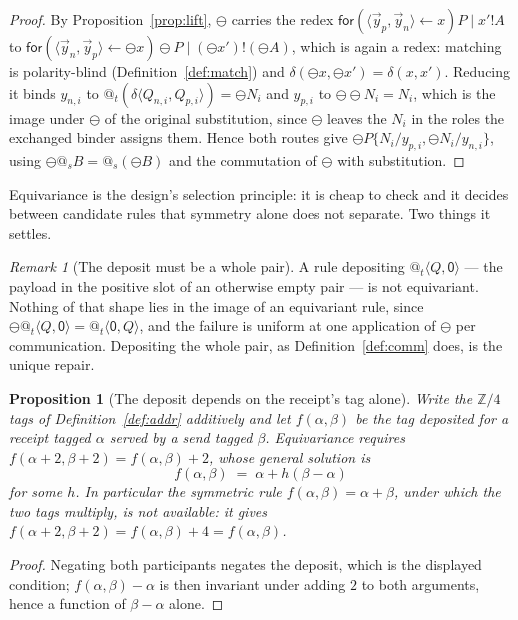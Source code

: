 \documentclass[11pt]{article}
\makeatletter
\newtheorem{proposition}[theorem]{Proposition}
\theoremstyle{definition}
\theoremstyle{remark}
\newtheorem{remark}[theorem]{Remark}
\newcommand{\pzero}{\mathsf{0}}
\newcommand{\quo}[1]{\ensuremath{@_{#1}}}
\newcommand{\dip}[2]{\ensuremath{\langle #1 , #2 \rangle}}
\newcommand{\negop}{\ensuremath{\ominus}}
\makeatother
\begin{document}
\begin{proof}
By Proposition~\ref{prop:lift}, $\negop$ carries the redex
$\mathsf{for}(\dip{\vec{y}_p}{\vec{y}_n} \leftarrow x)P \mid x'!A$ to
$\mathsf{for}(\dip{\vec{y}_n}{\vec{y}_p} \leftarrow \negop x)\negop P \mid
(\negop x')!(\negop A)$, which is again a redex: matching is polarity-blind
(Definition~\ref{def:match}) and $\delta(\negop x, \negop x') = \delta(x,x')$.
Reducing it binds $y_{n,i}$ to $\quo{t}(\delta\dip{Q_{n,i}}{Q_{p,i}}) = \negop
N_i$ and $y_{p,i}$ to $\negop\negop N_i = N_i$, which is the image under
$\negop$ of the original substitution, since $\negop$ leaves the $N_i$ in the
roles the exchanged binder assigns them. Hence both routes give
$\negop P\{N_i/y_{p,i}, \negop N_i/y_{n,i}\}$, using $\negop\quo{s}B =
\quo{s}(\negop B)$ and the commutation of $\negop$ with substitution.
\end{proof}

Equivariance is the design's selection principle: it is cheap to check and it
decides between candidate rules that symmetry alone does not separate. Two
things it settles.

\begin{remark}[The deposit must be a whole pair]
\label{rem:selection}
A rule depositing $\quo{t}\dip{Q}{\pzero}$ --- the payload in the positive slot
of an otherwise empty pair --- is not equivariant. Nothing of that shape lies in
the image of an equivariant rule, since
$\negop\quo{t}\dip{Q}{\pzero} = \quo{t}\dip{\pzero}{Q}$, and the failure is
uniform at one application of $\negop$ per communication. Depositing the whole
pair, as Definition~\ref{def:comm} does, is the unique repair.
\end{remark}

\begin{proposition}[The deposit depends on the receipt's tag alone]
\label{prop:fourcase}
Write the $\mathbb{Z}/4$ tags of Definition~\ref{def:addr} additively and let
$f(\alpha,\beta)$ be the tag deposited for a receipt tagged $\alpha$ served by a
send tagged $\beta$. Equivariance requires
$f(\alpha+2,\beta+2) = f(\alpha,\beta)+2$, whose general solution is
\[
  f(\alpha,\beta) \;=\; \alpha + h(\beta-\alpha)
\]
for some $h$. In particular the symmetric rule $f(\alpha,\beta) = \alpha+\beta$,
under which the two tags multiply, is not available: it gives
$f(\alpha+2,\beta+2) = f(\alpha,\beta)+4 = f(\alpha,\beta)$.
\end{proposition}

\begin{proof}
Negating both participants negates the deposit, which is the displayed
condition; $f(\alpha,\beta) - \alpha$ is then invariant under adding $2$ to
both arguments, hence a function of $\beta - \alpha$ alone.
\end{proof}
\end{document}
